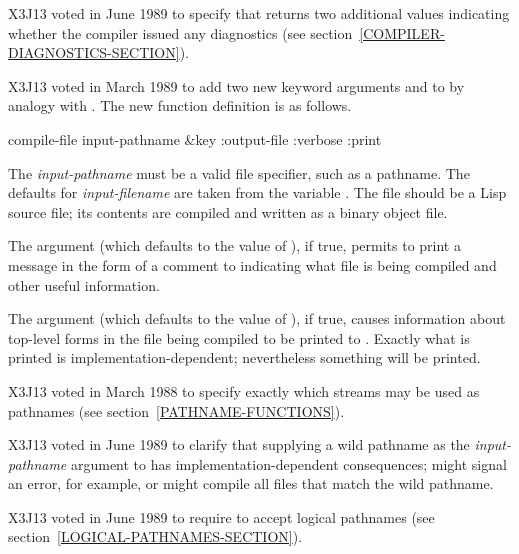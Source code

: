 \begin{defun}[Function]
\begin{newer}
X3J13 voted in June 1989  to specify that
 returns two additional values
indicating whether the compiler issued any diagnostics
(see section~\ref{COMPILER-DIAGNOSTICS-SECTION}).
\end{newer}
\end{defun}

X3J13 voted in March 1989  to add two new
keyword arguments  and 
to  by analogy with .
The new function definition is as follows.

\begin{defun}[Function]
compile-file input-pathname &key :output-file :verbose :print

The \emph{input-pathname} must be a valid file specifier, such as a pathname.
The defaults for \emph{input-filename} are taken from the variable
.
The file should be a Lisp source file;
its contents are compiled and written as a binary object file.

The  argument (which defaults to the value of
), if true, permits  to print a message
in the form of a comment to  indicating what file is
being compiled and other useful information.

The  argument (which defaults to the value of ),
if true, causes information about top-level forms in the file being
compiled to be printed to .  Exactly what is printed
is implementation-dependent; nevertheless something will be printed.
\end{defun}

\begin{new}
X3J13 voted in March 1988
to specify exactly which streams may be used as pathnames
(see section~\ref{PATHNAME-FUNCTIONS}).
\end{new}
\begin{newer}
X3J13 voted in June 1989 
to clarify that supplying a wild pathname
as the \emph{input-pathname} argument to  has implementation-dependent consequences;
 might signal an error, for example,
or might compile all files that match the wild pathname.
\end{newer}

\begin{newer}
X3J13 voted in June 1989  to require 
to accept logical pathnames (see section~\ref{LOGICAL-PATHNAMES-SECTION}).
\end{newer}

